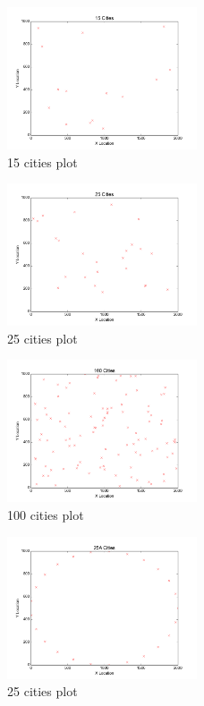 
\begin{figure}
    \centering
    \includegraphics[width=0.5\textwidth]{15cities.png}
    \caption{15 cities plot}
    \label{fig:15cities}
\end{figure}

\begin{figure}
    \centering
    \includegraphics[width=0.5\textwidth]{25cities.png}
    \caption{25 cities plot}
    \label{fig:25cities}
\end{figure}

\begin{figure}
    \centering
    \includegraphics[width=0.5\textwidth]{100cities.png}
    \caption{100 cities plot}
    \label{fig:100cities}
\end{figure}

\begin{figure}
    \centering
    \includegraphics[width=0.5\textwidth]{25cities_A.png}
    \caption{25 cities plot}
    \label{fig:25Acities}
\end{figure}